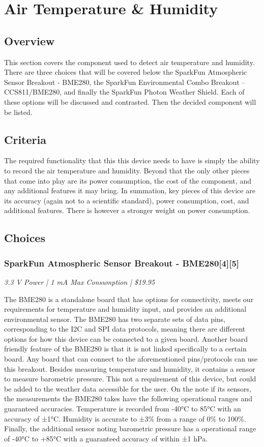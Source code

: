 \documentclass[IEEEtran,letterpaper,10pt,titlepage,fleqn,draftclsnofoot,onecolumn]{article}
\begin{document}
\section{Air Temperature \& Humidity}
\subsection{Overview}

This section covers the component used to detect air temperature and humidity. There are three choices that will be covered below the SparkFun Atmospheric Sensor Breakout - BME280, the SparkFun Environmental Combo Breakout – CCS811/BME280, and finally the SparkFun Photon Weather Shield. Each of these options will be discussed and contrasted. Then the decided component will be listed.  

\subsection{Criteria}

The required functionality that this this device needs to have is simply the ability to record the air temperature and humidity. Beyond that the only other pieces that come into play are its power consumption, the cost of the component, and any additional features it may bring. In summation, key pieces of this device are its accuracy (again not to a scientific standard), power consumption, cost, and additional features. There is however a stronger weight on power consumption.

\subsection{Choices}
\subsubsection{SparkFun Atmospheric Sensor Breakout - BME280[4][5]}
\textit{3.3 V Power | 1 mA Max Consumption | \$19.95}

\vspace{1mm}

The BME280 is a standalone board that has options for connectivity, meets our requirements for temperature and humidity input, and provides an additional environmental sensor. The BME280 has two separate sets of data pins, corresponding to the I2C and SPI data protocols, meaning there are different options for how this device can be connected to a given board. Another board friendly feature of the BME280 is that it is not linked specifically to a certain board. Any board that can connect to the aforementioned pins/protocols can use this breakout. Besides measuring temperature and humidity, it contains a sensor to measure barometric pressure. This not a requirement of this device, but could be added to the weather data accessible for the user. On the note if its sensors, the measurements the BME280 takes have the following operational ranges and guaranteed accuracies. Temperature is recorded from -40°C to 85°C with an accuracy of ±1°C. Humidity is accurate to ±3\% from a range of 0\% to 100\%. Finally, the additional sensor noting barometric pressure has a operational range of -40°C to +85°C with a guaranteed accuracy of within ±1 hPa.
\end{document}
